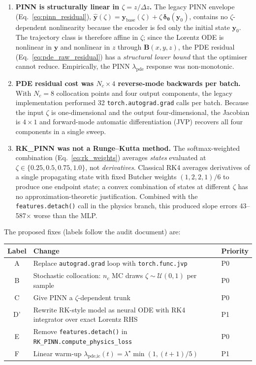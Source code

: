 \documentclass[a4paper,11pt]{article}
\newcommand{\dz}{\Delta z}
\newcommand{\Bfield}{\mathbf{B}}
\newcommand{\state}{\mathbf{y}}
\newcommand{\btheta}{\bm{\theta}}
\begin{document}
\begin{enumerate}
  \item \textbf{PINN is structurally linear in $\zeta = z / \dz$.}
    The legacy PINN envelope (Eq.~\ref{eq:pinn_residual}),
    $\hat{\state}(\zeta) = \state_\text{base}(\zeta) + \zeta\,\bm{\delta}_{\btheta}(\state_0)$,
    contains no $\zeta$-dependent nonlinearity because the encoder is fed
    only the initial state $\state_0$.  The trajectory class is therefore
    affine in $\zeta$; since the Lorentz ODE is nonlinear in $\state$ and
    nonlinear in $z$ through $\Bfield(x,y,z)$, the PDE residual
    (Eq.~\ref{eq:pde_raw_residual}) has a \emph{structural lower bound}
    that the optimiser cannot reduce.  Empirically, the PINN
    $\lambda_\text{pde}$ response was non-monotonic.
  \item \textbf{PDE residual cost was $N_c \times 4$ reverse-mode backwards
    per batch.}  With $N_c = 8$ collocation points and four output
    components, the legacy implementation performed 32
    \texttt{torch.autograd.grad} calls per batch.  Because the input
    $\zeta$ is one-dimensional and the output four-dimensional, the
    Jacobian is $4 \times 1$ and forward-mode automatic differentiation
    (JVP) recovers all four components in a single sweep.
  \item \textbf{RK\_PINN was not a Runge--Kutta method.}
    The softmax-weighted combination (Eq.~\ref{eq:rk_weights}) averages
    \emph{states} evaluated at $\zeta \in \{0.25, 0.5, 0.75, 1.0\}$, not
    \emph{derivatives}.  Classical RK4 averages derivatives of a single
    propagating state with fixed Butcher weights $(1, 2, 2, 1)/6$ to
    produce one endpoint state; a convex combination of states at
    different $\zeta$ has no approximation-theoretic justification.
    Combined with the \texttt{features.detach()} call in the physics
    branch, this produced slope errors 43--587$\times$ worse than the MLP.
\end{enumerate}

The proposed fixes (labels follow the audit document) are:
{\small
\begin{center}
\begin{tabular}{cll}
Label & Change & Priority \\
\hline
A  & Replace \texttt{autograd.grad} loop with \texttt{torch.func.jvp} & P0 \\
B  & Stochastic collocation: $n_c$ MC draws $\zeta \sim \mathcal{U}(0,1)$ per sample & P0 \\
C  & Give PINN a $\zeta$-dependent trunk & P0 \\
D' & Rewrite RK-style model as neural ODE with RK4 integrator over exact Lorentz RHS & P1 \\
E  & Remove \texttt{features.detach()} in \texttt{RK\_PINN.compute\_physics\_loss} & P0 \\
F  & Linear warm-up $\lambda_{\text{pde},\text{ic}}(t) = \lambda^\star \min(1, (t{+}1)/5)$ & P1 \\
\end{tabular}
\end{center}
}
\end{document}
